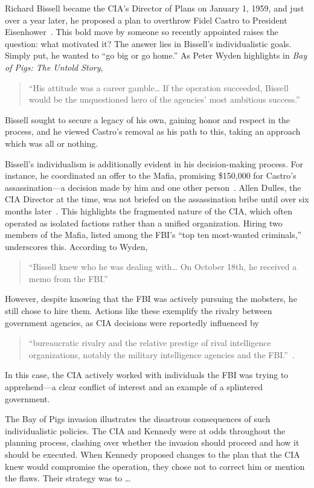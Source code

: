 \documentclass{article}
\begin{document}
    Richard Bissell became the CIA's Director of Plans on January 1, 1959, and just over a year later, he proposed a plan to overthrow Fidel Castro to President Eisenhower~\parencite{Wyden1979}. This bold move by someone so recently appointed raises the question: what motivated it? The answer lies in Bissell's individualistic goals. Simply put, he wanted to “go big or go home.” As Peter Wyden highlights in \textit{Bay of Pigs: The Untold Story}, 
    \begin{quotation}
        “His attitude was a career gamble… If the operation succeeded, Bissell would be the unquestioned hero of the agencies' most ambitious success.”
    \end{quotation} 
    Bissell sought to secure a legacy of his own, gaining honor and respect in the process, and he viewed Castro's removal as his path to this, taking an approach which was all or nothing.

    Bissell's individualism is additionally evident in his decision-making process. For instance, he coordinated an offer to the Mafia, promising \$150,000 for Castro's assassination—a decision made by him and one other person~\parencite{Wyden1979}. Allen Dulles, the CIA Director at the time, was not briefed on the assassination bribe until over six months later~\parencite{Wyden1979}. This highlights the fragmented nature of the CIA, which often operated as isolated factions rather than a unified organization. Hiring two members of the Mafia, listed among the FBI's “top ten most-wanted criminals,” underscores this. According to Wyden, \begin{quotation}
        “Bissell knew who he was dealing with… On October 18th, he received a memo from the FBI.”~\parencite{Wyden1979}
    \end{quotation}  
    However, despite knowing that the FBI was actively pursuing the mobsters, he still chose to hire them. Actions like these exemplify the rivalry between government agencies, as CIA decisions were reportedly influenced by 
    \begin{quotation} 
        “bureaucratic rivalry and the relative prestige of rival intelligence organizations, notably the military intelligence agencies and the FBI.”~\parencite{JeffreysJones2003}.
    \end{quotation} 
    In this case, the CIA actively worked with individuals the FBI was trying to apprehend—a clear conflict of interest and an example of a splintered government.

    The Bay of Pigs invasion illustrates the disastrous consequences of such individualistic policies. The CIA and Kennedy were at odds throughout the planning process, clashing over whether the invasion should proceed and how it should be executed. When Kennedy proposed changes to the plan that the CIA knew would compromise the operation, they chose not to correct him or mention the flaws. Their strategy was to \ldots
    
\end{document}
